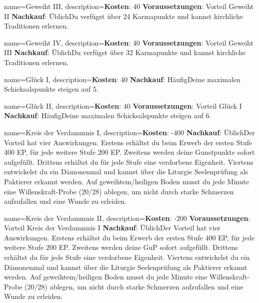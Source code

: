 {
    name={Geweiht III},
    description={\textbf{Kosten}: 40 \textbf{Voraussetzungen}: Vorteil Geweiht II \textbf{Nachkauf}: Üblich\newline Du verfügst über 24 Karmapunkte und kannst kirchliche Traditionen erlernen.}
}


{
    name={Geweiht IV},
    description={\textbf{Kosten}: 40 \textbf{Voraussetzungen}: Vorteil Geweiht III \textbf{Nachkauf}: Üblich\newline Du verfügst über 32 Karmapunkte und kannst kirchliche Traditionen erlernen.}
}


{
    name={Glück I},
    description={\textbf{Kosten}: 40 \textbf{Nachkauf}: Häufig\newline Deine maximalen Schicksalspunkte steigen auf 5.}
}


{
    name={Glück II},
    description={\textbf{Kosten}: 40 \textbf{Voraussetzungen}: Vorteil Glück I \textbf{Nachkauf}: Häufig\newline Deine maximalen Schicksalspunkte steigen auf 6.}
}


{
    name={Kreis der Verdammnis I},
    description={\textbf{Kosten}: -400 \textbf{Nachkauf}: Üblich\newline Der Vorteil hat vier Auswirkungen. Erstens erhältst du beim Erwerb der ersten Stufe 400 EP, für jede weitere Stufe 200 EP. Zweitens werden deine Gunstpunkte sofort aufgefüllt. Drittens erhältst du für jede Stufe eine verdorbene Eigenheit. Viertens entwickelst du ein Dämonenmal und kannst über die Liturgie Seelenprüfung als Paktierer erkannt werden. Auf geweihtem/heiligen Boden musst du jede Minute eine Willenskraft-Probe (20/28) ablegen, um nicht durch starke Schmerzen aufzufallen und eine Wunde zu erleiden.}
}


{
    name={Kreis der Verdammnis II},
    description={\textbf{Kosten}: -200 \textbf{Voraussetzungen}: Vorteil Kreis der Verdammnis I \textbf{Nachkauf}: Üblich\newline Der Vorteil hat vier Auswirkungen. Erstens erhältst du beim Erwerb der ersten Stufe 400 EP, für jede weitere Stufe 200 EP. Zweitens werden deine GuP sofort aufgefüllt. Drittens erhältst du für jede Stufe eine verdorbene Eigenheit. Viertens entwickelst du ein Dämonenmal und kannst über die Liturgie Seelenprüfung als Paktierer erkannt werden. Auf geweihtem/heiligen Boden musst du jede Minute eine Willenskraft-Probe (20/28) ablegen, um nicht durch starke Schmerzen aufzufallen und eine Wunde zu erleiden.}
}


